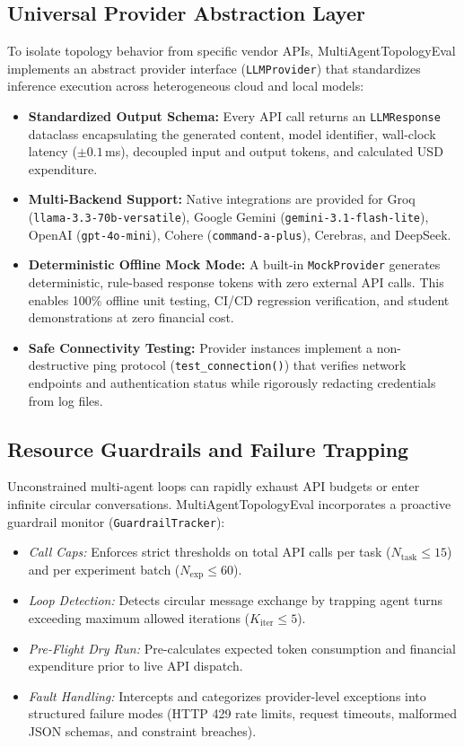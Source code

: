 \subsection{Universal Provider Abstraction Layer}
To isolate topology behavior from specific vendor APIs, MultiAgentTopologyEval implements an abstract provider interface (\texttt{LLMProvider}) that standardizes inference execution across heterogeneous cloud and local models:
\begin{itemize}
    \item \textbf{Standardized Output Schema:} Every API call returns an \texttt{LLMResponse} dataclass encapsulating the generated content, model identifier, wall-clock latency ($\pm 0.1\,$ms), decoupled input and output tokens, and calculated USD expenditure.
    \item \textbf{Multi-Backend Support:} Native integrations are provided for Groq (\texttt{llama-3.3-70b-versatile}), Google Gemini (\texttt{gemini-3.1-flash-lite}), OpenAI (\texttt{gpt-4o-mini}), Cohere (\texttt{command-a-plus}), Cerebras, and DeepSeek.
    \item \textbf{Deterministic Offline Mock Mode:} A built-in \texttt{MockProvider} generates deterministic, rule-based response tokens with zero external API calls. This enables 100\% offline unit testing, CI/CD regression verification, and student demonstrations at zero financial cost.
    \item \textbf{Safe Connectivity Testing:} Provider instances implement a non-destructive ping protocol (\texttt{test\_connection()}) that verifies network endpoints and authentication status while rigorously redacting credentials from log files.
\end{itemize}

\subsection{Resource Guardrails and Failure Trapping}
Unconstrained multi-agent loops can rapidly exhaust API budgets or enter infinite circular conversations. MultiAgentTopologyEval incorporates a proactive guardrail monitor (\texttt{GuardrailTracker}):
\begin{itemize}
    \item \textit{Call Caps:} Enforces strict thresholds on total API calls per task ($N_{\text{task}} \le 15$) and per experiment batch ($N_{\text{exp}} \le 60$).
    \item \textit{Loop Detection:} Detects circular message exchange by trapping agent turns exceeding maximum allowed iterations ($K_{\text{iter}} \le 5$).
    \item \textit{Pre-Flight Dry Run:} Pre-calculates expected token consumption and financial expenditure prior to live API dispatch.
    \item \textit{Fault Handling:} Intercepts and categorizes provider-level exceptions into structured failure modes (HTTP 429 rate limits, request timeouts, malformed JSON schemas, and constraint breaches).
\end{itemize}

